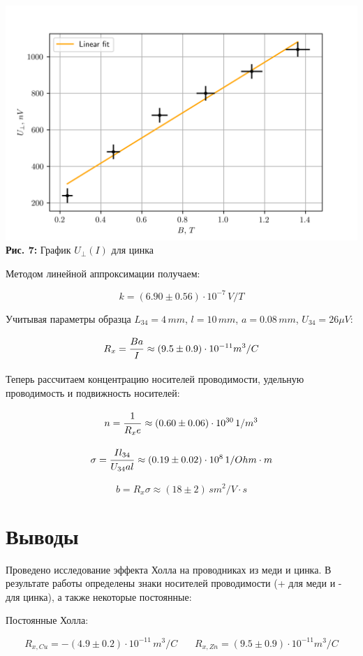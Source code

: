 \documentclass[12pt,a4paper]{scrartcl}
\begin{document}
	\begin{center}
		\includegraphics[scale=0.7]{PIC_7.png}
		\\\textbf{Рис. 7:} График $U_\perp(I)$ для цинка
	\end{center}
	
	Методом линейной аппроксимации получаем:
	
	$$k = (6.90 \pm 0.56) \cdot 10^{-7}\, V/T$$
	
	Учитывая параметры образца $L_{34} = 4\, mm$, $l = 10\, mm$, $a = 0.08\, mm$, $U_{34} = 26 \mu V$:

	$$R_x = \dfrac{\strut Ba}{\strut I} \approx (9.5 \pm 0.9) \cdot 10^{-11} m^3/C$$
	
	Теперь рассчитаем концентрацию носителей проводимости, удельную проводимость и подвижность носителей:
	
	$$n = \dfrac{\strut 1}{\strut R_xe} \approx (0.60 \pm 0.06) \cdot 10^{30}\, 1/m^3$$
	
	$$\sigma = \dfrac{\strut Il_{34}}{\strut U_{34}al} \approx (0.19 \pm 0.02) \cdot 10^8\, 1/Ohm \cdot m$$
	
	$$b = R_x\sigma \approx (18 \pm 2)\, sm^2/V\cdot s$$
	
	\section{Выводы}
	
	Проведено исследование эффекта Холла на проводниках из меди и цинка. В результате работы определены знаки носителей проводимости (+ для меди и - для цинка), а также некоторые постоянные:
	
	Постоянные Холла:
	
	$$R_{x, Cu} = -(4.9 \pm 0.2) \cdot 10^{-11}\, m^3/C\ \ \ \ \ \ \ \ R_{x, Zn} = (9.5 \pm 0.9) \cdot 10^{-11} m^3/C$$
	
\end{document}

